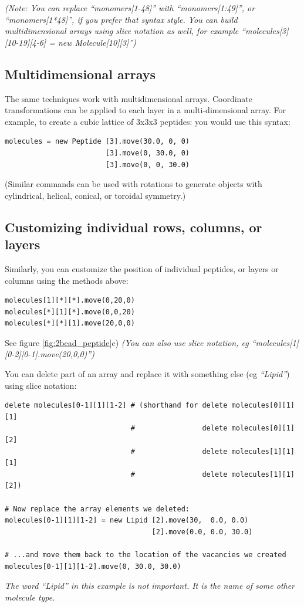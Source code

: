 \documentclass[11pt]{article}
\begin{document}
\textit{(Note: You can replace ``monomers[1-48]'' with
``monomers[1:49]'', or ``monomers[1*48]'', if you prefer that syntax style.
You can build multidimensional arrays using slice notation as well, for example
``molecules[3][10-19][4-6] = new Molecule[10][3]'')}



\subsection{Multidimensional arrays}
\label{sec:multidimensional_arrays}
The same techniques work with multidimensional arrays.
Coordinate transformations can be applied to each layer
in a multi-dimensional array.
For example, to create a cubic lattice of 3x3x3 peptides:
you would use this syntax:
\begin{verbatim}
molecules = new Peptide [3].move(30.0, 0, 0)
                        [3].move(0, 30.0, 0)
                        [3].move(0, 0, 30.0)
\end{verbatim}
(Similar commands can be used with rotations to generate objects
with cylindrical, helical, conical, or toroidal symmetry.)

\subsection{Customizing individual rows, columns, or layers}
Similarly, you can customize the position of individual peptides, 
or layers or columns using the methods above:
\begin{verbatim}
molecules[1][*][*].move(0,20,0)
molecules[*][1][*].move(0,0,20)
molecules[*][*][1].move(20,0,0)
\end{verbatim}
See figure \ref{fig:2bead_peptide}c)
\textit{(You can also use slice notation, 
         eg ``molecules[1][0-2][0-1].move(20,0,0)'')}

You can delete part of an array and replace it with something else
(eg \textit{``Lipid''})
using slice notation:
\begin{verbatim}
delete molecules[0-1][1][1-2] # (shorthand for delete molecules[0][1][1]
                              #                delete molecules[0][1][2]
                              #                delete molecules[1][1][1]
                              #                delete molecules[1][1][2])

# Now replace the array elements we deleted:
molecules[0-1][1][1-2] = new Lipid [2].move(30,  0.0, 0.0)
                                   [2].move(0.0, 0.0, 30.0)

# ...and move them back to the location of the vacancies we created
molecules[0-1][1][1-2].move(0, 30.0, 30.0)
\end{verbatim}
\textit{The word ``Lipid'' in this example is not important.
        It is the name of some other molecule type.}
\end{document}
